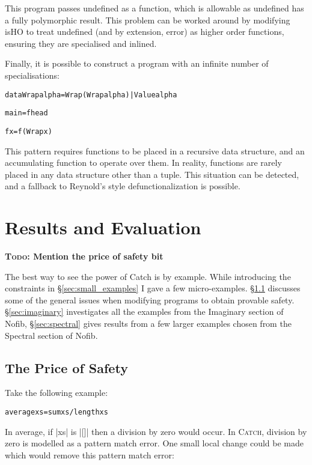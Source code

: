 \documentclass[preprint]{sigplanconf}
\newcommand{\C}[1]{\textsf{#1}}
\newcommand{\catch}{\textsc{Catch}}
\newcommand{\todo}[1]{\textbf{\textsc{Todo:} #1}}
\newenvironment{code}{\begin{alltt}\small}{\end{alltt}}
\begin{document}
This program passes \C{undefined} as a function, which is allowable as \C{undefined} has a fully polymorphic result. This problem can be worked around by modifying \C{isHO} to treat \C{undefined} (and by extension, \C{error}) as higher order functions, ensuring they are specialised and inlined.

Finally, it is possible to construct a program with an infinite number of specialisations:

\begin{code}
data Wrap alpha = Wrap (Wrap alpha) | Value alpha

main = f head

f x = f (Wrap x)
\end{code}

This pattern requires functions to be placed in a recursive data structure, and an accumulating function to operate over them. In reality, functions are rarely placed in any data structure other than a tuple. This situation can be detected, and a fallback to Reynold's style defunctionalization is possible.

\section{Results and Evaluation}
\label{sec:results}

\todo{Mention the price of safety bit}

The best way to see the power of Catch is by example. While introducing the constraints in \S\ref{sec:small_examples} I gave a few micro-examples. \S\ref{sec:safety} discusses some of the general issues when modifying programs to obtain provable safety. \S\ref{sec:imaginary} investigates all the examples from the Imaginary section of Nofib, \S\ref{sec:spectral} gives results from a few larger examples chosen from the Spectral section of Nofib.

\subsection{The Price of Safety}
\label{sec:safety}

Take the following example:

\begin{code}
average xs = sum xs / length xs
\end{code}

In \C{average}, if |xs| is |[]| then a division by zero would occur. In \catch{}, division by zero is modelled as a pattern match error. One small local change could be made which would remove this pattern match error:
\end{document}
